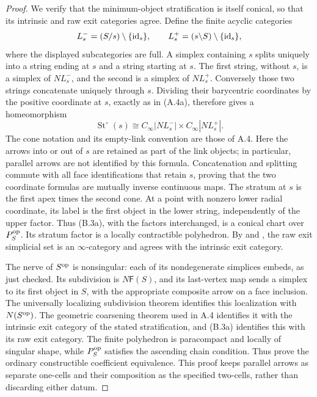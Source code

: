 \begin{proof}
We verify that the minimum-object stratification is itself conical,
so that its intrinsic and raw exit categories agree. Define the finite
acyclic categories
\[
 L_s^-=(S/s)\setminus\{\mathrm{id}_s\},\qquad
 L_s^+=(s\backslash S)\setminus\{\mathrm{id}_s\},
\]
where the displayed subcategories are full. A simplex containing $s$
splits uniquely into a string ending at $s$ and a string starting at
$s$. The first string, without $s$, is a simplex of $NL_s^-$, and the
second is a simplex of $NL_s^+$. Conversely those two strings
concatenate uniquely through $s$. Dividing their barycentric
coordinates by the positive coordinate at $s$, exactly as in (A.4a),
therefore gives a homeomorphism
\[
 \operatorname{St}^{\circ}(s)
       \cong C_\infty|NL_s^-|\times C_\infty|NL_s^+|.
\tag{B.3a}
\]
The cone notation and its empty-link convention are those of A.4.
Here the arrows into or out of $s$ are retained as part of the link
objects; in particular, parallel arrows are not identified by this
formula. Concatenation and splitting commute with all face
identifications that retain $s$, proving that the two coordinate
formulas are mutually inverse continuous maps. The stratum at $s$
is the first apex times the second cone. At a point with nonzero lower
radial coordinate, its label is the first object in the lower string,
independently of the upper factor. Thus (B.3a), with the factors
interchanged, is a conical chart over $P_S^{\mathrm{op}}$. Its stratum factor
is a locally contractible polyhedron. By
\citet[Theorem A.6.4]{LurieHA} and
\citet[Recollection 5.6.1]{HPT2026}, the raw exit simplicial set is an
$\infty$-category and agrees with the intrinsic exit category.

The nerve of $S^{\mathrm{op}}$ is nonsingular: each of its nondegenerate simplices
embeds, as just checked. Its subdivision is $N\mathsf F(S)$, and its
last-vertex map sends a simplex to its first object in $S$, with the
appropriate composite arrow on a face inclusion. The universally
localizing subdivision theorem
\citep[Proposition 6.3.6.2 and Remark 6.3.6.12]{KerodonSubdivision}
identifies this localization with $N(S^{\mathrm{op}})$. The geometric coarsening
theorem used in A.4 identifies it with the intrinsic exit category of
the stated stratification, and (B.3a) identifies this with its raw exit
category. The finite polyhedron is paracompact and locally of singular
shape, while $P_S^{\mathrm{op}}$ satisfies the ascending chain condition.
Thus \citet[Proposition A.5.9 and Theorem A.9.3]{LurieHA} prove the
ordinary constructible coefficient equivalence. This
proof keeps parallel arrows as separate one-cells and their composition
as the specified two-cells, rather than discarding either datum.
\end{proof}

